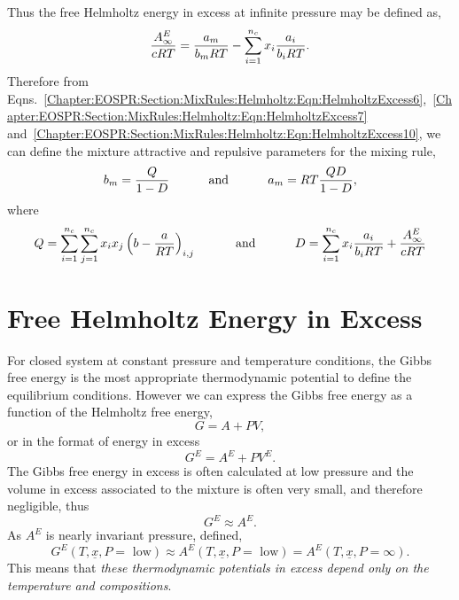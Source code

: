 Thus the free Helmholtz energy in excess at infinite pressure may be defined as,
   \begin{equation}
      \displaystyle\frac{A_{\infty}^{E}}{cRT} = \displaystyle\frac{a_{m}}{b_{m}RT} - \sum\limits_{i=1}^{n_{c}} x_{i} \displaystyle\frac{a_{i}}{b_{i}RT}.\label{Chapter:EOSPR:Section:MixRules:Helmholtz:Eqn:HelmholtzExcess10}
   \end{equation}
Therefore from Eqns.~\ref{Chapter:EOSPR:Section:MixRules:Helmholtz:Eqn:HelmholtzExcess6},~\ref{Chapter:EOSPR:Section:MixRules:Helmholtz:Eqn:HelmholtzExcess7} and~\ref{Chapter:EOSPR:Section:MixRules:Helmholtz:Eqn:HelmholtzExcess10}, we can define the mixture attractive and repulsive parameters for the mixing rule,
   \begin{equation}
        b_{m} = \displaystyle\frac{Q}{1-D} \hspace{1cm}\text{ and }\hspace{1cm} a_{m} = RT \displaystyle\frac{QD}{1-D},\label{Chapter:EOSPR:Section:MixRules:Helmholtz:Eqn:FinalMixRule1}
   \end{equation}
where
   \begin{equation}
     Q = \sum\limits_{i=1}^{n_{c}}\sum\limits_{j=1}^{n_{c}}x_{i}x_{j}\left(b- \displaystyle\frac{a}{RT}\right)_{i,j}\hspace{1cm}\text{ and }\hspace{1cm} D = \sum\limits_{i=1}^{n_{c}} x_{i}\displaystyle\frac{a_{i}}{b_{i}RT} + \displaystyle\frac{A_{\infty}^{E}}{cRT}\label{Chapter:EOSPR:Section:MixRules:Helmholtz:Eqn:FinalMixRule2}
   \end{equation}


\section{Free Helmholtz Energy in Excess}\label{Chapter:EOSPR:Section:HelmholtzExcess}
For closed system at constant pressure and temperature conditions, the Gibbs free energy is the most appropriate thermodynamic potential to define the equilibrium conditions.  However we can express the Gibbs free energy as a function of the Helmholtz free energy,
    \begin{displaymath}
       G = A + PV,
    \end{displaymath}
or in the format of energy in excess
    \begin{displaymath}
       G^{E} = A^{E} + PV^{E}.
    \end{displaymath}
The Gibbs free energy in excess is often calculated at low pressure and the volume in excess associated to the mixture is often very small, and therefore negligible, thus 
    \begin{displaymath}
       G^{E} \approx A^{E}. 
    \end{displaymath}
As $A^{E}$ is nearly invariant \wrt pressure, \citet{wong_1992} \citep[see also][]{orbey_1996} defined,
    \begin{displaymath}
       G^{E}\left(T, \underline{x}, P=\text{ low}\right) \approx A^{E}\left(T, \underline{x}, P=\text{ low}\right) = A^{E}\left(T, \underline{x}, P=\infty\right). 
    \end{displaymath}
This means that {\it these thermodynamic potentials in excess depend only on the temperature and compositions}.


